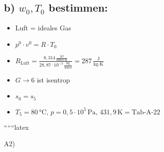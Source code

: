 \subsection*{b) $w_0, T_0$ bestimmen:}

\begin{itemize}
    \item Luft = ideales Gas
    \item $p^0 \cdot v^0 = R \cdot T_0$
    \item $R_{\text{Luft}} = \frac{8,314 \, \frac{\text{kJ}}{\text{kmol} \cdot \text{K}}}{28,87 \cdot 10^{-3} \, \frac{\text{kg}}{\text{kmol}}} = 287 \, \frac{\text{J}}{\text{kg} \cdot \text{K}}$
    \item $G \rightarrow 6$ ist isentrop
    \item $s_6 = s_5$
    \item $T_5 = 80 \, \text{°C}, \, p = 0,5 \cdot 10^5 \, \text{Pa}, \, 431,9 \, \text{K} = \text{Tab-A-22}$
\end{itemize}

``````latex

A2)